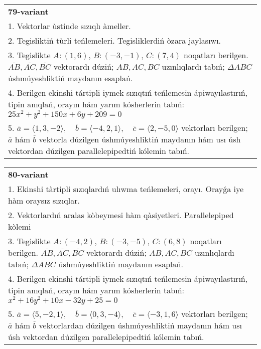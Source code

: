 \documentclass{article}
\begin{document}
\begin{tabular}{m{17cm}}
\textbf{79-variant}\\
1. Vektorlar ùstinde sızıqlı àmeller.\\

2. Tegisliktiń tùrli teńlemeleri. Tegisliklerdiń òzara jaylasıwı.\\

3. Tegislikte $A: (1, 6)$, $B: (-3, -1)$, $C: (7, 4)$ noqatları berilgen. $\overline{AB}, \overline{AC}, \overline{BC}$ vektorardı dúziń; $AB, AC, BC$ uzınlıqlardı tabıń; $\Delta ABC$ úshmúyeshliktiń maydanın esaplań. \\

4. Berilgen ekinshi tártipli iymek sızıqtıń teńlemesin ápiwayılastırıń, tipin anıqlań, orayın hám yarım kósherlerin tabıń: $25x^2+y^2+150x+6y+209=0$\\

5. \(\overline{a} = \langle 1, 3, -2 \rangle, \quad \overline{b} = \langle -4, 2, 1 \rangle, \quad \overline{c} = \langle 2, -5, 0 \rangle\) vektorları berilgen; \(\overline{a}\) hám \(\overline{b}\) vektorla dúzilgen úshmúyeshliktiń maydanın hám usı úsh vektordan dúzilgen parallelepipedtiń kólemin tabıń.
\end{tabular}
\vspace{1cm}


\begin{tabular}{m{17cm}}
\textbf{80-variant}\\
1. Ekinshi tàrtipli sızıqlardıń ulıwma teńlemeleri, orayı. Orayǵa iye hàm oraysız sızıqlar.\\

2. Vektorlardıń aralas kòbeymesi hàm qàsiyetleri. Parallelepiped kòlemi\\

3. Tegislikte $A: (-4, 2)$, $B: (-3, -5)$, $C: (6, 8)$ noqatları berilgen. $\overline{AB}, \overline{AC}, \overline{BC}$ vektorardı dúziń; $AB, AC, BC$ uzınlıqlardı tabıń; $\Delta ABC$ úshmúyeshliktiń maydanın esaplań. \\

4. Berilgen ekinshi tártipli iymek sızıqtıń teńlemesin ápiwayılastırıń, tipin anıqlań, orayın hám yarım kósherlerin tabıń: $x^2+16y^2+10x-32y+25=0$\\

5. \(\overline{a} = \langle 5, -2, 1 \rangle, \quad \overline{b} = \langle 0, 3, -4 \rangle, \quad \overline{c} = \langle -3, 1, 6 \rangle\) vektorları berilgen; \(\overline{a}\) hám \(\overline{b}\) vektorlardan dúzilgen úshmúyeshliktiń maydanın hám usı úsh vektordan dúzilgen parallelepipedtiń kólemin tabıń.
\end{tabular}
\vspace{1cm}
\end{document}

